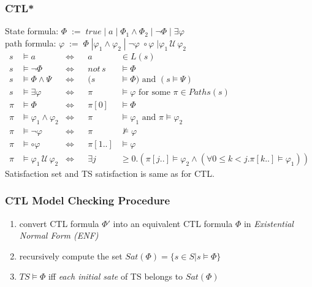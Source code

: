 \documentclass[a4paper, 10pt]{article}
\newcommand{\until}{\,\mathcal{U}\,}
\begin{document}
\subsubsection{CTL*}

\begin{mdframed}[roundcorner=5pt,
subtitlebelowline=false,subtitleaboveline=false,
subtitlebackgroundcolor=blue!30,
frametitlerule=true,
frametitlebackgroundcolor=blue!30,
frametitle={CTL$^*$}
]
State formula: $\Phi\;:=\;true\;|\;a\;|\;\Phi_1\wedge\Phi_2\;|\;\neg\Phi\;|\;\exists\varphi$
\\
path formula: $\varphi\;:=\;\Phi\;|\varphi_1\wedge\varphi_2\;|\;\neg\varphi\;\circ\varphi\;|\varphi_1\until\varphi_2$
\begin{align*}
s&\models a &\iff&& a&\in L(s) \\
s&\models \neg\Phi &\iff&& not\,s&\models\Phi \\
s&\models \Phi\wedge\Psi &\iff&& (s&\models\Phi) \text{ and }(s\models\Psi) \\
s&\models \exists\varphi &\iff&& \pi&\models\varphi \text{ for some } \pi\in Paths(s)\\
\pi&\models\Phi &\iff&& \pi[0]&\models\Phi\\
\pi&\models \varphi_1\wedge\varphi_2 &\iff&& \pi&\models\varphi_1 \text{ and } \pi\models\varphi_2\\
\pi&\models \neg\varphi &\iff&& \pi&\not\models\varphi\\
\pi&\models \circ\varphi &\iff&& \pi[1..]&\models\varphi\\
\pi&\models \varphi_1\until\varphi_2&\iff&& \exists j&\geq0.(\pi[j..]\models\varphi_2\wedge(\forall 0\leq k<j.\pi[k..]\models\varphi_1))
\end{align*}
Satisfaction set and TS satisfaction is same as for CTL.
\begin{center}
\scalebox{1}{}
\end{center}
\end{mdframed}

\subsubsection{CTL Model Checking Procedure}

\begin{enumerate}
    \item convert CTL formula $\Phi'$ into an equivalent CTL formula $\Phi$ in \emph{Existential Normal Form (ENF)}
    \item recursively compute the set $Sat(\Phi)=\{s\in S|s\models\Phi\}$
    \item $TS\models\Phi$ iff \emph{each initial sate} of TS belongs to $Sat(\Phi)$
\end{enumerate}
\end{document}
